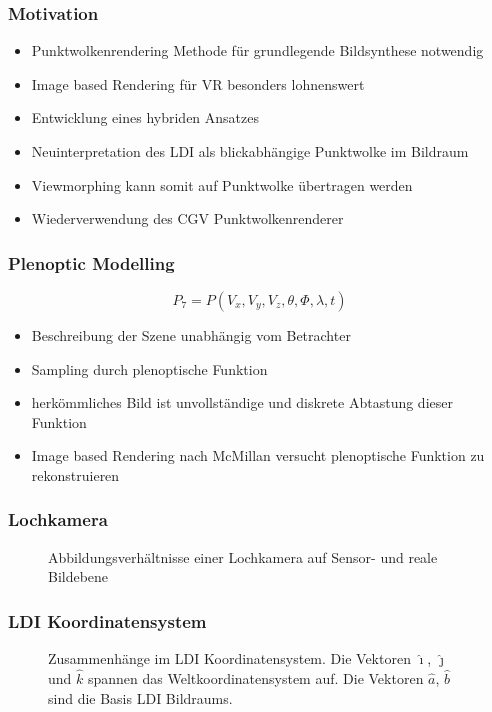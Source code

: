 \documentclass[aspectratio=169]{beamer}
\begin{document}
\begin{frame}
    \frametitle{Motivation}
    \begin{itemize}
        \item Punktwolkenrendering Methode für grundlegende Bildsynthese notwendig
        \item Image based Rendering für VR besonders lohnenswert
        \item Entwicklung eines hybriden Ansatzes
        \item Neuinterpretation des LDI als blickabhängige Punktwolke im Bildraum
        \item Viewmorphing kann somit auf Punktwolke übertragen werden
        \item Wiederverwendung des CGV Punktwolkenrenderer
    \end{itemize}
\end{frame}

\begin{frame}
    \frametitle{Plenoptic Modelling}

    \begin{equation}
        P_7 = P(V_x, V_y, V_z, \theta, \Phi, \lambda, t)
    \end{equation}

    \begin{itemize}
        \item Beschreibung der Szene unabhängig vom Betrachter
        \item Sampling durch plenoptische Funktion
        \item herkömmliches Bild ist unvollständige und diskrete Abtastung dieser Funktion
        \item Image based Rendering nach McMillan versucht plenoptische Funktion zu rekonstruieren
    \end{itemize}
\end{frame}

\begin{frame}
    \frametitle{Lochkamera}
    \begin{figure}
        \centering
        \resizebox{.8\linewidth}{!}{}
        \caption{Abbildungsverhältnisse einer Lochkamera auf Sensor- und reale
            Bildebene}%
        \label{fig:pinholecamera}
    \end{figure}
\end{frame}

\begin{frame}
    \frametitle{LDI Koordinatensystem}
    \begin{figure}
        \centering
        \resizebox{.6\linewidth}{!}{}
        \caption{Zusammenhänge im LDI Koordinatensystem. Die Vektoren \( \hat{\imath}
            \), \( \hat{\jmath} \) und \( \hat{k} \) spannen das Weltkoordinatensystem
            auf. Die Vektoren \( \hat{a} \), \( \hat{b} \) sind die Basis LDI
            Bildraums.}%
        \label{fig:ldicoord}
    \end{figure}
\end{frame}
\end{document}
